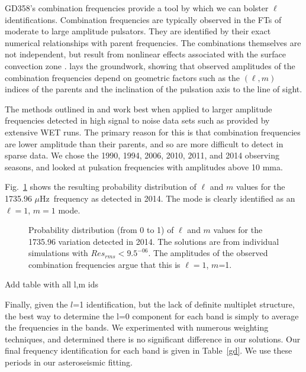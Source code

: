 \documentclass[12pt,preprint]{aastex}
\newcommand{\muHz}{\mbox{$\mu$Hz}}
\begin{document}
GD358's combination frequencies provide a tool by which we can bolster $\ell$ identifications. 
Combination frequencies are typically observed in the FTs of moderate to large amplitude pulsators.  
They are identified by their exact numerical relationships with parent frequencies.  
The combinations themselves are not independent, but result from nonlinear effects associated 
with the surface convection zone \citep{Brickhill92, Brassard95, Wu01, Ising01}.  
\citet{Wu01} lays the groundwork, showing that observed amplitudes of the combination 
frequencies depend on geometric factors such as the $(\ell,m)$ indices of the parents and the 
inclination of the pulsation axis to the line of sight.  

The methods outlined in \citet{Provencal12} and \citet{Montgomery10} work best when applied to 
larger amplitude frequencies detected in high signal to noise data sets such as provided by 
extensive WET runs.  The primary reason for this is that combination frequencies are lower 
amplitude than their parents, and so are more difficult to detect in sparse data.  We chose 
the 1990, 1994, 2006, 2010, 2011, and 2014 observing seasons, and looked at pulsation 
frequencies with amplitudes above 10 mma.  

Fig.~\ref{modeamps} shows the resulting probability distribution of $\ell$ and $m$ values for the 1735.96 \muHz\
frequency as detected in 2014. The mode is clearly identified as an $\ell=1$, $m=1$ mode. 

\begin{figure}
 \caption{Probability distribution (from 0 to 1) of $\ell$ and $m$ values for the 1735.96 variation detected in 
 2014.  The solutions are from individual simulations with $Res_{rms}<9.5^{-06}$. The amplitudes of the 
 observed combination frequencies argue that this is $\ell=1$, $m$=1.  
 \label{modeamps}
 }
\end{figure}

Add table with all l,m ids

Finally, given the $l$=1 identification, but the lack of definite multiplet structure, the best way to 
determine the l=0 component for each band is simply to average the frequencies in the bands.  We experimented
with numerous weighting techniques, and determined there is no significant difference in our solutions.  
Our final frequency identification for each band is given in Table~\ref{gd}. We use these periods in our asteroseismic fitting. 
\end{document}
